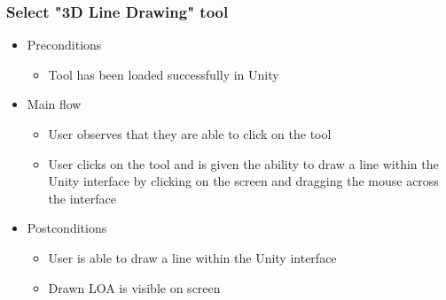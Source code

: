\subsubsection{Select "3D Line Drawing" tool}
    \begin{itemize}
    \item Preconditions
        \begin{itemize}
            \item Tool has been loaded successfully in Unity
        \end{itemize}
    \end{itemize}
    \begin{itemize}
        \item Main flow
        \begin{itemize}
            \item User observes that they are able to click on the tool
            \item User clicks on the tool and is given the ability to draw a line within the Unity interface by clicking on the screen and dragging the mouse across the interface
        \end{itemize}
    \end{itemize}
    \begin{itemize}
        \item Postconditions
        \begin{itemize}
            \item User is able to draw a line within the Unity interface
            \item Drawn LOA is visible on screen
        \end{itemize}
    \end{itemize}

